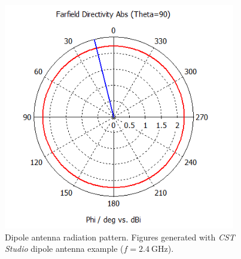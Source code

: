 \begin{figure}[H]
\begin{minipage}{0.45\textwidth}
        \includegraphics[width=0.9\textwidth]{figures/farfield (f=2.4) dipole_1.png} %
    \end{minipage}
    \caption{Dipole antenna radiation pattern. Figures generated with \textit{CST Studio} dipole antenna example ($f=\SI{2.4}{\giga\hertz}$).}
    \label{fig:dipole_1}
\end{figure}

